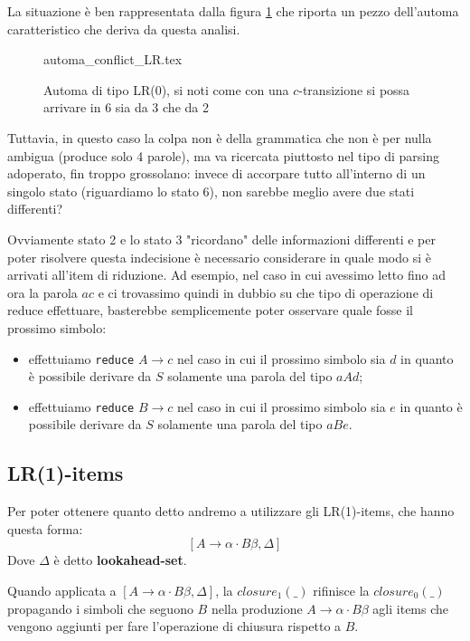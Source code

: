 \documentclass[class=book, crop=false, oneside, 12pt]{standalone}
\begin{document}
La situazione è ben rappresentata dalla figura \ref{fig:lr0-automata_conflict} che riporta un pezzo dell'automa caratteristico che deriva da questa analisi.

\begin{figure}
    \centering
    {automa_conflict_LR.tex}
    \caption{Automa di tipo LR(0), si noti come con una \(c\)-transizione si possa arrivare in 6 sia da 3 che da 2}
    \label{fig:lr0-automata_conflict}
\end{figure}

Tuttavia, in questo caso la colpa non è della grammatica che non è per nulla ambigua (produce solo 4 parole), ma va ricercata piuttosto nel tipo di parsing adoperato, fin troppo grossolano: invece di accorpare tutto all'interno di un singolo stato (riguardiamo lo stato 6), non sarebbe meglio avere due stati differenti? 

Ovviamente stato 2 e lo stato 3 "ricordano" delle informazioni differenti e per poter risolvere questa indecisione è necessario considerare in quale modo si è arrivati all'item di riduzione. Ad esempio, nel caso in cui avessimo letto fino ad ora la parola \(ac\) e ci trovassimo quindi in dubbio su che tipo di operazione di reduce effettuare, basterebbe semplicemente poter osservare quale fosse il prossimo simbolo: 
\begin{itemize}
    \item effettuiamo \texttt{reduce} \(A \to c\) nel caso in cui il prossimo simbolo sia \(d\) in quanto è possibile derivare da \(S\) solamente una parola del tipo \(aAd\);
    \item effettuiamo \texttt{reduce} \(B \to c\) nel caso in cui il prossimo simbolo sia \(e\) in quanto è possibile derivare da \(S\) solamente una parola del tipo \(aBe\).
\end{itemize}

\subsection{LR(1)-items}
Per poter ottenere quanto detto andremo a utilizzare gli LR(1)-items, che hanno questa forma:
\begin{equation}
    \label{lr0}
    [A \to \alpha \cdot B \beta, \Delta]
\end{equation}
Dove \(\Delta\) è detto \textbf{lookahead-set}.

Quando applicata a \([A \to \alpha \cdot B \beta, \Delta]\), la \(closure_1(\_)\) rifinisce la \(closure_0(\_)\) propagando i simboli che seguono \(B\) nella produzione \(A \to \alpha \cdot B \beta\) agli items che vengono aggiunti per fare l'operazione di chiusura rispetto a \(B\).
\end{document}
